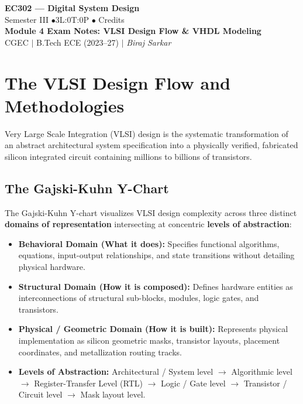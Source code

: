 \documentclass[12pt,a4paper]{article}
\begin{document}
\begin{center}
  {\LARGE\bfseries\color{myred} EC302 --- Digital System Design}\\[5pt]
  {\normalsize\color{mydark} Semester III \quad$\bullet$\quad 3L:0T:0P \quad$\bullet$ Credits}\\[3pt]
  {\normalsize\color{myteal}\textbf{Module 4 Exam Notes: VLSI Design Flow \& VHDL Modeling}}\\[3pt]
  {\small\color{mydark} CGEC \;$|$\; B.Tech ECE (2023--27) \;$|$\; \textit{Biraj Sarkar}}
\end{center}
\vspace{2pt}
\noindent{\color{myred}\rule{\linewidth}{1.5pt}}
\vspace{2pt}

\hypersetup{linkcolor=mydark}
\tableofcontents
\hypersetup{linkcolor=myteal}
\newpage

\section{The VLSI Design Flow and Methodologies}

Very Large Scale Integration (VLSI) design is the systematic transformation of an abstract architectural system specification into a physically verified, fabricated silicon integrated circuit containing millions to billions of transistors.

\subsection{The Gajski-Kuhn Y-Chart}
The Gajski-Kuhn Y-chart visualizes VLSI design complexity across three distinct \textbf{domains of representation} intersecting at concentric \textbf{levels of abstraction}:
\begin{itemize}[leftmargin=*, itemsep=3pt]
  \item \textbf{Behavioral Domain (What it does):} Specifies functional algorithms, equations, input-output relationships, and state transitions without detailing physical hardware.
  \item \textbf{Structural Domain (How it is composed):} Defines hardware entities as interconnections of structural sub-blocks, modules, logic gates, and transistors.
  \item \textbf{Physical / Geometric Domain (How it is built):} Represents physical implementation as silicon geometric masks, transistor layouts, placement coordinates, and metallization routing tracks.
  \item \textbf{Levels of Abstraction:} Architectural / System level $\to$ Algorithmic level $\to$ Register-Transfer Level (RTL) $\to$ Logic / Gate level $\to$ Transistor / Circuit level $\to$ Mask layout level.
\end{itemize}
\end{document}
